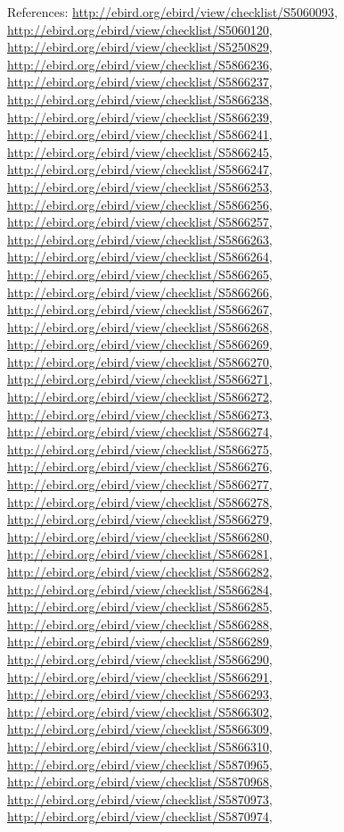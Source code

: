 \documentclass[9pt, article]{memoir}
\begin{document}
\begin{multicols}{2}
\vspace{6pt}References: 
\url{http://ebird.org/ebird/view/checklist/S5060093}, 
\url{http://ebird.org/ebird/view/checklist/S5060120}, 
\url{http://ebird.org/ebird/view/checklist/S5250829}, 
\url{http://ebird.org/ebird/view/checklist/S5866236}, 
\url{http://ebird.org/ebird/view/checklist/S5866237}, 
\url{http://ebird.org/ebird/view/checklist/S5866238}, 
\url{http://ebird.org/ebird/view/checklist/S5866239}, 
\url{http://ebird.org/ebird/view/checklist/S5866241}, 
\url{http://ebird.org/ebird/view/checklist/S5866245}, 
\url{http://ebird.org/ebird/view/checklist/S5866247}, 
\url{http://ebird.org/ebird/view/checklist/S5866253}, 
\url{http://ebird.org/ebird/view/checklist/S5866256}, 
\url{http://ebird.org/ebird/view/checklist/S5866257}, 
\url{http://ebird.org/ebird/view/checklist/S5866263}, 
\url{http://ebird.org/ebird/view/checklist/S5866264}, 
\url{http://ebird.org/ebird/view/checklist/S5866265}, 
\url{http://ebird.org/ebird/view/checklist/S5866266}, 
\url{http://ebird.org/ebird/view/checklist/S5866267}, 
\url{http://ebird.org/ebird/view/checklist/S5866268}, 
\url{http://ebird.org/ebird/view/checklist/S5866269}, 
\url{http://ebird.org/ebird/view/checklist/S5866270}, 
\url{http://ebird.org/ebird/view/checklist/S5866271}, 
\url{http://ebird.org/ebird/view/checklist/S5866272}, 
\url{http://ebird.org/ebird/view/checklist/S5866273}, 
\url{http://ebird.org/ebird/view/checklist/S5866274}, 
\url{http://ebird.org/ebird/view/checklist/S5866275}, 
\url{http://ebird.org/ebird/view/checklist/S5866276}, 
\url{http://ebird.org/ebird/view/checklist/S5866277}, 
\url{http://ebird.org/ebird/view/checklist/S5866278}, 
\url{http://ebird.org/ebird/view/checklist/S5866279}, 
\url{http://ebird.org/ebird/view/checklist/S5866280}, 
\url{http://ebird.org/ebird/view/checklist/S5866281}, 
\url{http://ebird.org/ebird/view/checklist/S5866282}, 
\url{http://ebird.org/ebird/view/checklist/S5866284}, 
\url{http://ebird.org/ebird/view/checklist/S5866285}, 
\url{http://ebird.org/ebird/view/checklist/S5866288}, 
\url{http://ebird.org/ebird/view/checklist/S5866289}, 
\url{http://ebird.org/ebird/view/checklist/S5866290}, 
\url{http://ebird.org/ebird/view/checklist/S5866291}, 
\url{http://ebird.org/ebird/view/checklist/S5866293}, 
\url{http://ebird.org/ebird/view/checklist/S5866302}, 
\url{http://ebird.org/ebird/view/checklist/S5866309}, 
\url{http://ebird.org/ebird/view/checklist/S5866310}, 
\url{http://ebird.org/ebird/view/checklist/S5870965}, 
\url{http://ebird.org/ebird/view/checklist/S5870968}, 
\url{http://ebird.org/ebird/view/checklist/S5870973}, 
\url{http://ebird.org/ebird/view/checklist/S5870974}, 

\end{multicols}
\end{document}

